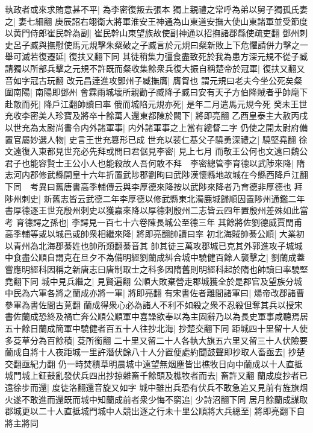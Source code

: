 執政者或來求賄意甚不平|{
	為李密復叛去張本}
獨上親禮之常呼為弟以舅子獨孤氏妻之|{
	妻七細翻}
庚辰詔右翊衛大將軍淮安王神通為山東道安撫大使山東諸軍並受節度以黄門侍郎崔民幹為副|{
	崔民幹山東望族故使副神通以招撫諸郡縣使疏吏翻}
鄧州刺史呂子臧與撫慰使馬元規擊朱粲破之子臧言於元規曰粲新敗上下危懼請併力擊之一舉可滅若復遷延|{
	復扶又翻下同}
其徒稍集力彊食盡致死於我為患方深元規不從子臧請獨以所部兵擊之元規不許既而粲收集餘衆兵復大振自稱楚帝於冠軍|{
	復扶又翻又音如字冠古玩翻}
改元昌逹進攻鄧州子臧撫膺|{
	膺胷也}
謂元規曰老夫今坐公死矣粲圍南陽|{
	南陽即鄧州}
會霖雨城壞所親勸子臧降子臧曰安有天子方伯降賊者乎帥麾下赴敵而死|{
	降戶江翻帥讀曰率}
俄而城陷元規亦死|{
	是年二月遣馬元規今死}
癸未王世充收李密美人珍寶及將卒十餘萬人還東都陳於闕下|{
	將即亮翻}
乙酉皇泰主大赦丙戌以世充為太尉尚書令内外諸軍事|{
	内外諸軍事之上當有總督二字}
仍使之開太尉府備置官屬妙選人物|{
	史言王世充簒形已成}
世充以裴仁基父子驍勇深禮之|{
	驍堅堯翻}
徐文遠復入東都見世充必先拜或問曰君倨見李密|{
	見上七月}
而敬王公何也文遠曰魏公君子也能容賢士王公小人也能殺故人吾何敢不拜　李密總管李育德以武陟來降|{
	隋志河内郡修武縣開皇十六年折置武陟郡劉昫曰武陟漢懷縣地故城在今縣西降戶江翻下同　考異曰舊唐書高季輔傳云與李厚德來降按以武陟來降者乃育德非厚德也}
拜陟州刺史|{
	新舊志皆云武德二年李厚德以修武縣東北濁鹿城歸順因置陟州通鑑二年書厚德逐王世充殷州刺史以獲嘉來降以厚德刺殷州二志皆云四年置殷州差殊如此當考}
育德諤之孫也|{
	李諤見一百七十六卷陳長城公至德三年}
其餘將佐劉德威賈閏甫高季輔等或以城邑或帥衆相繼來降|{
	將即亮翻帥讀曰率}
初北海賊帥綦公順|{
	大業初以青州為北海郡綦姓也帥所類翻綦音其}
帥其徒三萬攻郡城已克其外郭進攻子城城中食盡公順自謂克在旦夕不為備明經劉蘭成糾合城中驍健百餘人襲擊之|{
	劉蘭成蓋嘗應明經科因稱之新唐志曰唐制取士之科多因隋舊則明經科起於隋也帥讀曰率驍堅堯翻下同}
城中見兵繼之|{
	見賢遍翻}
公順大敗棄營走郡城獲全於是郡官及望族分城中民為六軍各將之蘭成亦將一軍|{
	將即亮翻}
有宋書佐者離間諸軍曰|{
	煬帝改郡諸曹參軍為書佐間古莧翻}
蘭成得衆心必為諸人不利不如殺之衆不忍殺但奪其兵以授宋書佐蘭成恐終及禍亡奔公順公順軍中喜譟欲奉以為主固辭乃以為長史軍事咸聽焉居五十餘日蘭成簡軍中驍健者百五十人往抄北海|{
	抄楚交翻下同}
距城四十里留十人使多芟草分為百餘積|{
	芟所銜翻}
二十里又留二十人各執大旗五六里又留三十人伏險要蘭成自將十人夜距城一里許潛伏餘八十人分置便處約聞鼓聲即抄取人畜亟去|{
	抄楚交翻亟紀力翻}
仍一時焚積草明晨城中遠望無烟塵皆出樵牧日向中蘭成以十人直抵城門城上鉦鼓亂發伏兵四出抄掠雜畜千餘頭及樵牧者而去|{
	畜許又翻}
蘭成度抄者已遠徐步而還|{
	度徒洛翻還音旋又如字}
城中雖出兵恐有伏兵不敢急追又見前有旌旗烟火遂不敢進而還既而城中知蘭成前者衆少悔不窮追|{
	少詩沼翻下同}
居月餘蘭成謀取郡城更以二十人直抵城門城中人競出逐之行未十里公順將大兵總至|{
	將即亮翻下自將主將同}
